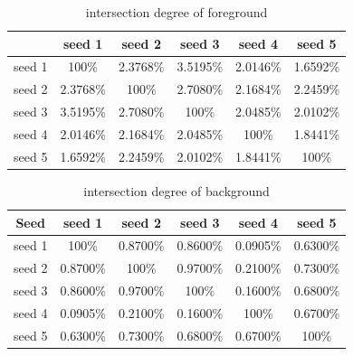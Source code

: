 \documentclass[runningheads,a4paper]{llncs}
\begin{document}
\begin{table}
\centering
\begin{tabular}{|c|c|c|c|c|c|}
\hline
 & seed 1 & seed 2 & seed 3 & seed 4& seed 5 \\
\hline
seed 1 & 100\% & 2.3768\% & 3.5195\% & 2.0146\%& 1.6592\% \\
\hline
seed 2 & 2.3768\% & 100\% & 2.7080\% & 2.1684\%& 2.2459\% \\
\hline
seed 3 & 3.5195\% & 2.7080\% & 100\% & 2.0485\%& 2.0102\%\\
\hline
seed 4 & 2.0146\% & 2.1684\% & 2.0485\% & 100\%& 1.8441\% \\
\hline
seed 5 & 1.6592\% & 2.2459\% & 2.0102\% & 1.8441\%& 100\% \\
\hline
\end{tabular}
\caption{intersection degree of foreground}
\label{table1}
\end{table} 

\begin{table}
\centering
\begin{tabular}{|c|c|c|c|c|c|}
\hline
 Seed & seed 1 & seed 2 & seed 3 & seed 4& seed 5 \\
\hline
seed 1 & 100\% & 0.8700\% & 0.8600\% & 0.0905\%& 0.6300\% \\
\hline
seed 2 & 0.8700\% & 100\% & 0.9700\% & 0.2100\%& 0.7300\% \\
\hline
seed 3 & 0.8600\% & 0.9700\% & 100\% & 0.1600\%& 0.6800\%\\
\hline
seed 4 & 0.0905\% & 0.2100\% & 0.1600\% & 100\%& 0.6700\% \\
\hline
seed 5 & 0.6300\% & 0.7300\% & 0.6800\% & 0.6700\% & 100\% \\
\hline
\end{tabular}
\caption{intersection degree of background}
\end{table} 
\end{document}
